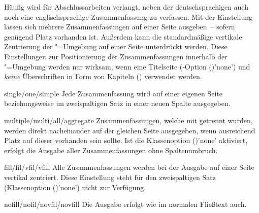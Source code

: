 \begin{Declaration*}{}
\begin{Declaration*}{}
\begin{Declaration*}{}
\begin{Declaration}[%
  v2.02!\Option{abstract=multiple}:ersetzt \Option{abstract=double};%
  v2.02!\Option{abstract=tocleveldown};%
  v2.02!\Option{abstract=markboth};%
  v2.04!\Option{abstract=tocmultiple}%
]{}
Häufig wird für Abschlussarbeiten verlangt, neben der deutschsprachigen auch 
noch eine englischsprachige Zusammenfassung zu verfassen. Mit der Einstellung 
 lassen sich mehrere Zusammenfassungen auf einer 
Seite ausgeben~-- sofern genügend Platz vorhanden ist. Außerdem kann die 
standardmäßige vertikale Zentrierung der "=Umgebung 
auf einer Seite unterdrückt werden. Diese Einstellungen zur Positionierung der 
Zusammenfassungen innerhalb der "=Umgebung werden nur 
wirksam, wenn eine Titelseite
(\KOMAScript-Option ()'none') und 
\emph{keine} Überschriften in Form von Kapiteln () 
verwendet werden.
%
\begin{values}{}
\item[single/one/simple]
  Jede Zusammenfassung wird auf einer eigenen Seite
  beziehungsweise im zweispaltigen Satz in einer neuen Spalte ausgegeben.
\item[multiple/multi/all/aggregate]
  Zusammenfassungen, welche mit  getrennt wurden, werden 
  direkt nacheinander auf der gleichen Seite ausgegeben, wenn ausreichend Platz 
  auf dieser vorhanden sein sollte. Ist die Klassenoption 
  ()'none' aktiviert, erfolgt die Ausgabe 
  aller Zusammenfassungen ohne Spaltenumbruch.
\item[fill/fil/vfil/vfill]
  Alle Zusammenfassungen werden bei der Ausgabe auf einer Seite vertikal 
  zentriert. Diese Einstellung steht für den zweispaltigen Satz
  (Klassenoption ()'none') nicht zur 
  Verfügung.
\item[nofill/nofil/novfil/novfill]
  Die Ausgabe erfolgt wie im normalen Fließtext auch.
\end{values}
\end{Declaration}


\end{Declaration*}
\end{Declaration*}
\end{Declaration*}
